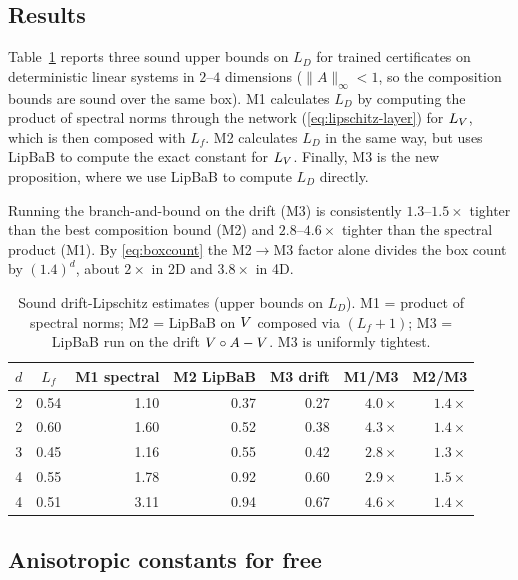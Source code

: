 \subsection{Results}

Table~\ref{tab:tightdrift} reports three sound upper bounds on $L_D$ for trained certificates on deterministic linear systems in $2$--$4$ dimensions ($\|A\|_\infty<1$, so the composition bounds are sound over the same box). M1 calculates $L_D$ by computing the product of spectral norms through the network (\eqref{eq:lipschitz-layer}) for $L_V$, which is then composed with $L_f$. M2 calculates $L_D$ in the same way, but uses LipBaB to compute the exact constant for $L_V$. Finally, M3 is the new proposition, where we use LipBaB to compute $L_D$ directly.

Running the branch-and-bound on the drift (M3) is consistently $1.3$--$1.5\times$ tighter than the best composition bound (M2) and $2.8$--$4.6\times$ tighter than the spectral product (M1). By \eqref{eq:boxcount} the M2$\to$M3 factor alone divides the box count by $(1.4)^d$, about $2\times$ in 2D and $3.8\times$ in 4D.

\begin{table}[htbp]
\centering
\begin{tabular}{cc rrr rr}
\hline
$d$ & $L_f$ & M1 spectral & M2 LipBaB & M3 drift & M1/M3 & M2/M3 \\
\hline
2 & 0.54 & 1.10 & 0.37 & 0.27 & $4.0\times$ & $1.4\times$ \\
2 & 0.60 & 1.60 & 0.52 & 0.38 & $4.3\times$ & $1.4\times$ \\
3 & 0.45 & 1.16 & 0.55 & 0.42 & $2.8\times$ & $1.3\times$ \\
4 & 0.55 & 1.78 & 0.92 & 0.60 & $2.9\times$ & $1.5\times$ \\
4 & 0.51 & 3.11 & 0.94 & 0.67 & $4.6\times$ & $1.4\times$ \\
\hline
\end{tabular}
\caption{Sound drift-Lipschitz estimates (upper bounds on $L_D$). M1 = product of spectral norms;
M2 = LipBaB on $V$ composed via $(L_f{+}1)$; M3 = LipBaB run on the drift $V\circ A-V$. M3 is uniformly
tightest.}
\label{tab:tightdrift}
\end{table}

\subsection{Anisotropic constants for free}
\label{subsec:aniso}


